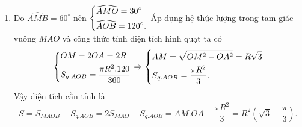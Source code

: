 \begin{ex}
{\begin{enumerate}
        Suy ra $\widehat{MHO}=\widehat{MBO}=90^\circ$, do đó tứ giác $MHOB$ nội tiếp, suy ra $\widehat{MHB}=\widehat{MOB}$ (cùng chắn cung $\wideparen{MB}$).\\
        Chứng minh tương tự ta có tứ giác $MAHO$ nội tiếp, suy ra $\widehat{MHA}=\widehat{MOA}$. Mặt khác $\widehat{MOA}=\widehat{MOB}$ nên $\widehat{MHA}=\widehat{MHB}$. \\
        Vậy $HM$ là tia phân giác của góc $\widehat{AHB}.$
        \item Do $\widehat{AMB}=60^\circ$ nên $\left\{\begin{aligned}&\widehat{AMO}=30^\circ \\ &\widehat{AOB}=120^\circ.\end{aligned}\right.$ Áp dụng hệ thức lượng trong tam giác vuông $MAO$ và công thức tính diện tích hình quạt ta có
        $$\left\{\begin{aligned}& OM=2OA=2R\\ & S_{q.AOB}=\dfrac{\pi R^2.120}{360}\end{aligned}\right.\Rightarrow \left\{\begin{aligned}& AM=\sqrt{OM^2-OA^2}=R\sqrt{3}\\ & S_{q.AOB}=\dfrac{\pi R^2}{3}.\end{aligned}\right.$$
        Vậy diện tích cần tính là
        $$S=S_{MAOB}-S_{q.AOB}=2S_{MAO}-S_{q.AOB}=AM.OA-\dfrac{\pi R^2}{3}=R^2\left(\sqrt{3}-\dfrac{\pi}{3}\right).$$
    \end{enumerate}
    }
\end{ex}

